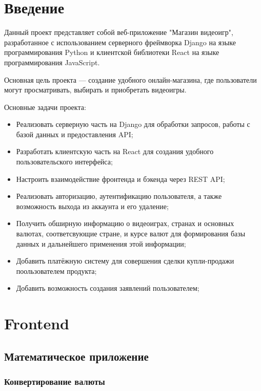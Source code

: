 \documentclass[a4paper,14pt]{extarticle}
\begin{document}
	\tableofcontents
	\newpage
	
	\section{Введение}
	
	Данный проект представляет собой веб-приложение "Магазин видеоигр", разработанное с использованием серверного фреймворка Django на языке программирования Python и клиентской библиотеки React на языке программирования JavaScript.
	
	Основная цель проекта — создание удобного онлайн-магазина, где пользователи могут просматривать, выбирать и приобретать видеоигры. 
	
	Основные задачи проекта:
	\begin{itemize}
		\item Реализовать серверную часть на Django для обработки запросов, работы с базой данных и предоставления API;
		\item Разработать клиентскую часть на React для создания удобного пользовательского интерфейса;
		\item Настроить взаимодействие фронтенда и бэкенда через REST API;
		\item Реализовать авторизацию, аутентификацию пользователя, а также возможность выхода из аккаунта и его удаление;
		\item Получить обширную информацию о видеоиграх, странах и основных валютах, соответсвующие стране, и курсе валют для формирования базы данных и дальнейшего применения этой информации;
		\item Добавить платёжную систему для совершения сделки купли-продажи поользователем продукта;
		\item Добавить возможность создания заявлений пользователем;
	\end{itemize}
	
	\newpage
	
	\section{Frontend}
	\subsection{Математическое приложение}
	\subsubsection{Конвертирование валюты}
	
\end{document}
